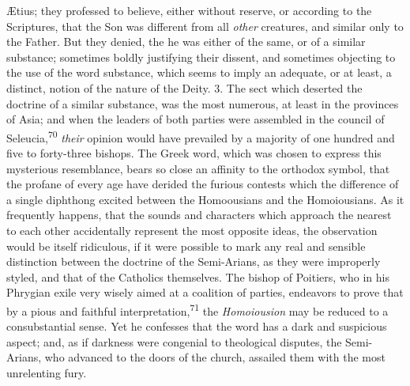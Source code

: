 Ætius; they professed to believe, either without reserve, or
according to the Scriptures, that the Son was different from all
\textit{other} creatures, and similar only to the Father. But they
denied, the he was either of the same, or of a similar substance;
sometimes boldly justifying their dissent, and sometimes
objecting to the use of the word substance, which seems to imply
an adequate, or at least, a distinct, notion of the nature of the
Deity. 3. The sect which deserted the doctrine of a similar
substance, was the most numerous, at least in the provinces of
Asia; and when the leaders of both parties were assembled in the
council of Seleucia,\textsuperscript{70} \textit{their} opinion would have prevailed by a
majority of one hundred and five to forty-three bishops. The
Greek word, which was chosen to express this mysterious
resemblance, bears so close an affinity to the orthodox symbol,
that the profane of every age have derided the furious contests
which the difference of a single diphthong excited between the
Homoousians and the Homoiousians. As it frequently happens, that
the sounds and characters which approach the nearest to each
other accidentally represent the most opposite ideas, the
observation would be itself ridiculous, if it were possible to
mark any real and sensible distinction between the doctrine of
the Semi-Arians, as they were improperly styled, and that of the
Catholics themselves. The bishop of Poitiers, who in his Phrygian
exile very wisely aimed at a coalition of parties, endeavors to
prove that by a pious and faithful interpretation,\textsuperscript{71} the
\textit{Homoiousion} may be reduced to a consubstantial sense. Yet he
confesses that the word has a dark and suspicious aspect; and, as
if darkness were congenial to theological disputes, the
Semi-Arians, who advanced to the doors of the church, assailed
them with the most unrelenting fury.



